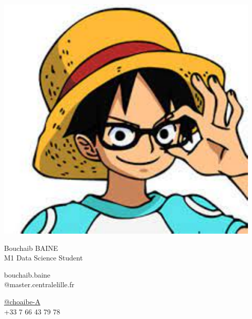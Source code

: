 \documentclass{article}
\begin{document}
\centering \includegraphics[width=0.25\linewidth]{logo}\\[5pt]
\parbox{2in}{\Large \centering  Bouchaib BAINE\\[1pt]
\normalsize M1 Data Science Student}

\vfill
\raggedright
\begin{multicols}{2}
bouchaib.baine \\
@master.centralelille.fr

\columnbreak
\raggedleft
\href{https://github.com/choaibe-A}{@choaibe-A}\\
+33 7 66 43 79 78%
\end{multicols}%
\end{document}
